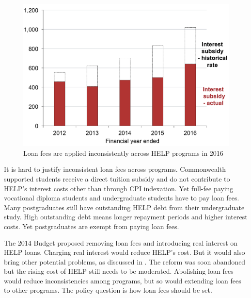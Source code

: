 \documentclass[embargoed]{grattan}
\begin{document}
\begin{figure}
\caption[Loan fees are applied inconsistently across HELP programs in 2016]{Loan fees are applied inconsistently across \gls{HELP} programs in 2016}\label{fig:fig19-loan-fees-are-applied-inconsitently-across-HELP-programs-2016}

\includegraphics[page=19]{atlas/Chartpack.pdf}

\end{figure}

It is hard to justify inconsistent loan fees across programs.
Commonwealth supported students receive a direct tuition subsidy and do not contribute to \gls{HELP}'s interest costs other than through \gls{CPI} indexation.
Yet full-fee paying vocational diploma students and undergraduate students have to pay loan fees.
Many postgraduates still have outstanding \gls{HELP} debt from their undergraduate study.
High outstanding debt means longer repayment periods and higher interest costs.
Yet postgraduates are exempt from paying loan fees.

The 2014 Budget proposed removing loan fees and introducing real interest on \gls{HELP} loans.
Charging real interest would reduce \gls{HELP}'s cost.
But it would also bring other potential problems, as discussed in .
The reform was soon abandoned but the rising cost of \gls{HELP} still needs to be moderated.
Abolishing loan fees would reduce inconsistencies among programs, but so would extending loan fees to other programs.
The policy question is how loan fees should be set.
\end{document}
